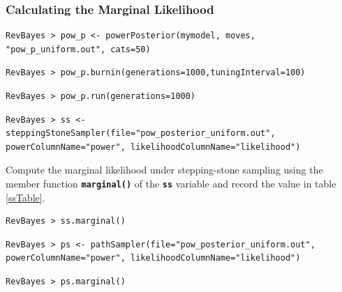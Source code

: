 \documentclass[11pt]{article}
\newcommand{\cl}[1]{{\texttt{\textbf{#1}}}}
\begin{document}
\subsubsection*{Calculating the Marginal Likelihood}

{\tt \begin{snugshade*}
\begin{lstlisting}
RevBayes > pow_p <- powerPosterior(mymodel, moves, "pow_p_uniform.out", cats=50) 
\end{lstlisting}
\end{snugshade*}}

{\tt \begin{snugshade*}
\begin{lstlisting}
RevBayes > pow_p.burnin(generations=1000,tuningInterval=100)
\end{lstlisting}
\end{snugshade*}}

{\tt \begin{snugshade*}
\begin{lstlisting}
RevBayes > pow_p.run(generations=1000)  
\end{lstlisting}
\end{snugshade*}}

{\tt \small \begin{snugshade*}
\begin{lstlisting}
RevBayes > ss <- steppingStoneSampler(file="pow_posterior_uniform.out", powerColumnName="power", likelihoodColumnName="likelihood")
\end{lstlisting}
\end{snugshade*}}

Compute the marginal likelihood under stepping-stone sampling using the member function \cl{marginal()} of the \cl{ss} variable and record the value in table \ref{ssTable}.
{\tt \begin{snugshade*}
\begin{lstlisting}
RevBayes > ss.marginal() 
\end{lstlisting}
\end{snugshade*}}


{\tt \small \begin{snugshade*}
\begin{lstlisting}
RevBayes > ps <- pathSampler(file="pow_posterior_uniform.out", powerColumnName="power", likelihoodColumnName="likelihood")
\end{lstlisting}
\end{snugshade*}}

{\tt \begin{snugshade*}
\begin{lstlisting}
RevBayes > ps.marginal() 
\end{lstlisting}
\end{snugshade*}}
\end{document}
